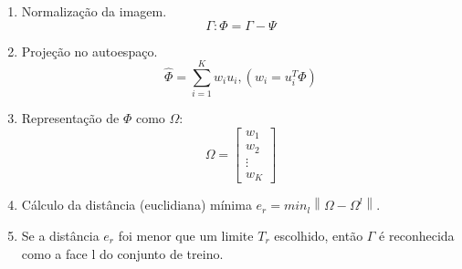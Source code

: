 \begin{enumerate}
    \item Normalização da imagem.
        \begin{equation} \label{eq:eign_rec_norm}
            \Gamma: \Phi = \Gamma - \Psi
        \end{equation}
    \item Projeção no autoespaço.
        \begin{equation} \label{eq:eign_rec_lincomb}
            \hat{\Phi} = \sum_{i=1}^{K}w_iu_i, (w_i = u_{i}^{T}\Phi)
        \end{equation}
    \item Representação de $\Phi$ como $\Omega$:
        \begin{equation} \label{eq:eign_rec_omg}
            \Omega = \begin{bmatrix}
            w_{1}\\ 
            w_{2}\\ 
            \vdots\\ 
            w_{K}
            \end{bmatrix}
        \end{equation}
    \item Cálculo da distância (euclidiana) mínima $e_r = min_l\left \| \Omega - \Omega^l \right \|$.
    \item Se a distância $e_r$ foi menor que um limite $T_r$ escolhido, então $\Gamma$ é reconhecida como a face l do conjunto de treino.
\end{enumerate}


